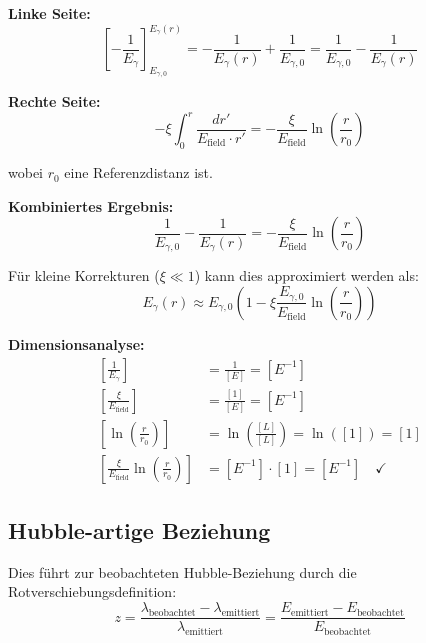 \documentclass[12pt,a4paper]{report}
\begin{document}
	\textbf{Linke Seite:}
	\begin{equation}
		\left[-\frac{1}{E_\gamma}\right]_{E_{\gamma,0}}^{E_\gamma(r)} = -\frac{1}{E_\gamma(r)} + \frac{1}{E_{\gamma,0}} = \frac{1}{E_{\gamma,0}} - \frac{1}{E_\gamma(r)}
	\end{equation}
	
	\textbf{Rechte Seite:}
	\begin{equation}
		-\xi \int_0^r \frac{dr'}{E_{\text{field}} \cdot r'} = -\frac{\xi}{E_{\text{field}}} \ln\left(\frac{r}{r_0}\right)
	\end{equation}
	
	wobei $r_0$ eine Referenzdistanz ist.
	
	\textbf{Kombiniertes Ergebnis:}
	\begin{equation}
		\frac{1}{E_{\gamma,0}} - \frac{1}{E_\gamma(r)} = -\frac{\xi}{E_{\text{field}}} \ln\left(\frac{r}{r_0}\right)
	\end{equation}
	
	Für kleine Korrekturen ($\xi \ll 1$) kann dies approximiert werden als:
	\begin{equation}
		E_\gamma(r) \approx E_{\gamma,0} \left(1 - \xi \frac{E_{\gamma,0}}{E_{\text{field}}} \ln\left(\frac{r}{r_0}\right)\right)
	\end{equation}
	
	\textbf{Dimensionsanalyse:}
	\begin{align}
		\left[\frac{1}{E_\gamma}\right] &= \frac{1}{[E]} = [E^{-1}] \\
		\left[\frac{\xi}{E_{\text{field}}}\right] &= \frac{[1]}{[E]} = [E^{-1}] \\
		\left[\ln\left(\frac{r}{r_0}\right)\right] &= \ln\left(\frac{[L]}{[L]}\right) = \ln([1]) = [1] \\
		\left[\frac{\xi}{E_{\text{field}}} \ln\left(\frac{r}{r_0}\right)\right] &= [E^{-1}] \cdot [1] = [E^{-1}] \quad \checkmark
	\end{align}
	
	\subsection{Hubble-artige Beziehung}
	\label{subsec:hubble_like_relation}
	
	Dies führt zur beobachteten Hubble-Beziehung durch die Rotverschiebungsdefinition:
	\begin{equation}
		z = \frac{\lambda_{\text{beobachtet}} - \lambda_{\text{emittiert}}}{\lambda_{\text{emittiert}}} = \frac{E_{\text{emittiert}} - E_{\text{beobachtet}}}{E_{\text{beobachtet}}}
	\end{equation}
	
\end{document}

